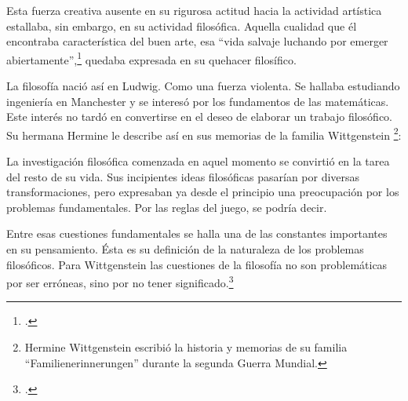 Esta fuerza creativa ausente en su rigurosa actitud hacia la actividad artística
estallaba, sin embargo, en su actividad filosófica. Aquella cualidad que él
encontraba característica del buen arte, esa ``vida salvaje luchando por emerger
abiertamente'',\footcite[cf.˜][loc.˜]{monk} quedaba expresada en su quehacer
filosífico.

La filosofía nació así en Ludwig. Como una fuerza violenta. Se hallaba
estudiando ingeniería en Manchester y se interesó por los fundamentos de las
matemáticas. Este interés no tardó en convertirse en el deseo de elaborar un
trabajo filosófico. Su hermana Hermine le describe así en sus memorias de la
familia Wittgenstein
\footnote{Hermine Wittgenstein escribió la historia y memorias de su familia
  ``Familienerinnerungen'' durante la segunda Guerra Mundial.}:


La investigación filosófica comenzada en aquel momento se convirtió en la tarea
del resto de su vida. Sus incipientes ideas filosóficas pasarían por diversas
transformaciones, pero expresaban ya desde el principio una preocupación por los
problemas fundamentales. Por las reglas del juego, se podría decir.

Entre esas cuestiones fundamentales se halla una de las constantes importantes
en su pensamiento. Ésta es su definición de la naturaleza de los problemas
filosóficos. Para Wittgenstein las cuestiones de la filosofía no son
problemáticas por ser erróneas, sino por no tener
significado.\footcite[cf.~][4.003]{tractatus}

